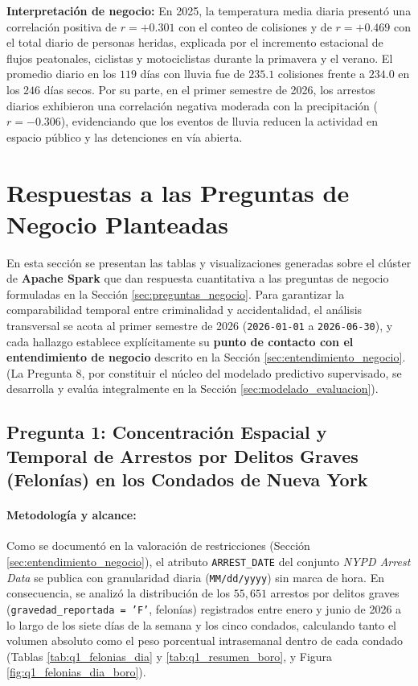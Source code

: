 \documentclass[11pt,a4paper]{article}
\begin{document}
\noindent \textbf{Interpretación de negocio:} En 2025, la temperatura media diaria presentó una correlación positiva de $r = +0.301$ con el conteo de colisiones y de $r = +0.469$ con el total diario de personas heridas, explicada por el incremento estacional de flujos peatonales, ciclistas y motociclistas durante la primavera y el verano. El promedio diario en los $119$ días con lluvia fue de $235.1$ colisiones frente a $234.0$ en los $246$ días secos. Por su parte, en el primer semestre de 2026, los arrestos diarios exhibieron una correlación negativa moderada con la precipitación ($r = -0.306$), evidenciando que los eventos de lluvia reducen la actividad en espacio público y las detenciones en vía abierta.



\section{Respuestas a las Preguntas de Negocio Planteadas}
\label{sec:respuestas_preguntas}

En esta sección se presentan las tablas y visualizaciones generadas sobre el clúster de \textbf{Apache Spark} que dan respuesta cuantitativa a las preguntas de negocio formuladas en la Sección \ref{sec:preguntas_negocio}. Para garantizar la comparabilidad temporal entre criminalidad y accidentalidad, el análisis transversal se acota al primer semestre de 2026 (\texttt{2026-01-01} a \texttt{2026-06-30}), y cada hallazgo establece explícitamente su \textbf{punto de contacto con el entendimiento de negocio} descrito en la Sección \ref{sec:entendimiento_negocio}. (La Pregunta 8, por constituir el núcleo del modelado predictivo supervisado, se desarrolla y evalúa integralmente en la Sección \ref{sec:modelado_evaluacion}).

\subsection{Pregunta 1: Concentración Espacial y Temporal de Arrestos por Delitos Graves (Felonías) en los Condados de Nueva York}
\label{subsec:respuesta_q1}

\paragraph{Metodología y alcance:} Como se documentó en la valoración de restricciones (Sección \ref{sec:entendimiento_negocio}), el atributo \texttt{ARREST\_DATE} del conjunto \textit{NYPD Arrest Data} se publica con granularidad diaria (\texttt{MM/dd/yyyy}) sin marca de hora. En consecuencia, se analizó la distribución de los $55,651$ arrestos por delitos graves (\texttt{gravedad\_reportada = 'F'}, felonías) registrados entre enero y junio de 2026 a lo largo de los siete días de la semana y los cinco condados, calculando tanto el volumen absoluto como el peso porcentual intrasemanal dentro de cada condado (Tablas \ref{tab:q1_felonias_dia} y \ref{tab:q1_resumen_boro}, y Figura \ref{fig:q1_felonias_dia_boro}).
\end{document}
